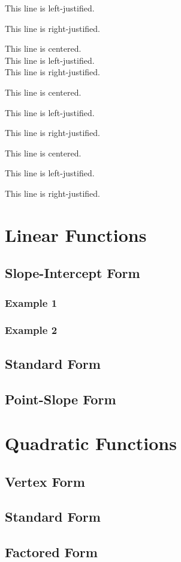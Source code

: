 \documentclass[11pt]{article}
\begin{document}
\begin{flushleft}
This line is left-justified.
\end{flushleft}

\begin{flushright}
This line is right-justified.
\end{flushright}

\centering
This line is centered. \\
This line is left-justified.\\
This line is right-justified.

\vspace{1 cm}

\Large
This line is centered. 

This line is left-justified.

This line is right-justified.

\vspace{1 cm}

\tiny
This line is centered. 

This line is left-justified.

This line is right-justified.

\raggedright
\section{Linear Functions}
	\subsection{Slope-Intercept Form}
		\subsubsection{Example 1}
		\subsubsection{Example 2}
	\subsection{Standard Form}
	\subsection{Point-Slope Form}
\section{Quadratic Functions}
	\subsection{Vertex Form}
	\subsection{Standard Form}
	\subsection{Factored Form}
\end{document}
